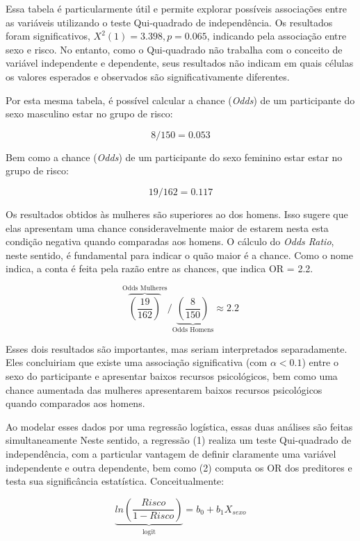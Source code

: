 \documentclass[
]{book}
\begin{document}
Essa tabela é particularmente útil e permite explorar possíveis associações entre as variáveis utilizando o teste Qui-quadrado de independência. Os resultados foram significativos, \(X^2(1) = 3.398, p = 0.065\), indicando pela associação entre sexo e risco. No entanto, como o Qui-quadrado não trabalha com o conceito de variável independente e dependente, seus resultados não indicam em quais células os valores esperados e observados são significativamente diferentes.

Por esta mesma tabela, é possível calcular a chance (\emph{Odds}) de um participante do sexo masculino estar no grupo de risco:

\[8/150 = 0.053\]

Bem como a chance (\emph{Odds}) de um participante do sexo feminino estar estar no grupo de risco:

\[19/162 = 0.117\]

Os resultados obtidos às mulheres são superiores ao dos homens. Isso sugere que elas apresentam uma chance consideravelmente maior de estarem nesta esta condição negativa quando comparadas aos homens. O cálculo do \emph{Odds Ratio}, neste sentido, é fundamental para indicar o quão maior é a chance. Como o nome indica, a conta é feita pela razão entre as chances, que indica OR = 2.2.

\[{\overbrace{\left ( \frac{19}{162}\right)}^\text{Odds Mulheres}}/{\underbrace{\left ( \frac{8}{150} \right)}_\text{Odds Homens}} \approx 2.2\]

Esses dois resultados são importantes, mas seriam interpretados separadamente. Eles concluiriam que existe uma associação significativa (com \(\alpha < 0.1\)) entre o sexo do participante e apresentar baixos recursos psicológicos, bem como uma chance aumentada das mulheres apresentarem baixos recursos psicológicos quando comparados aos homens.

Ao modelar esses dados por uma regressão logística, essas duas análises são feitas simultaneamente Neste sentido, a regressão (1) realiza um teste Qui-quadrado de independência, com a particular vantagem de definir claramente uma variável independente e outra dependente, bem como (2) computa os OR dos preditores e testa sua significância estatística. Conceitualmente:

\[\underbrace{ln\left ( \frac{Risco}{1-Risco} \right)}_\text{logit} = b_0 + b_1X_{sexo}\]
\end{document}

